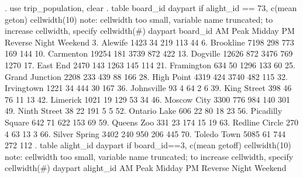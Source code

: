 . use trip_population, clear
{\smallskip}
. table board_id daypart if alight_id == 73, c(mean geton) cellwidth(10)
{\smallskip}
note: cellwidth too small, variable name truncated;
      to increase cellwidth, specify cellwidth(\#)
{\smallskip}
                     {\VBAR}                          daypart                          
            board_id {\VBAR}    AM Peak      Midday  PM Reverse       Night     Weekend
          3. Alewife {\VBAR}       1423          34         219         113          44
        6. Brookline {\VBAR}       7198         298         773         169         144
       10. Carmenton {\VBAR}      19254         181        3739         872         422
        13. Dogville {\VBAR}      12626         872        3476         769        1270
        17. East End {\VBAR}       2470         143        1263         145         114
      21. Framington {\VBAR}        634          50        1296         133          60
  25. Grand Junction {\VBAR}       2208         233         439          88         166
      28. High Point {\VBAR}       4319         424        3740         482         115
      32. Irvingtown {\VBAR}       1221          34         444          30         167
      36. Johnsville {\VBAR}         93           4          64           2           6
     39. King Street {\VBAR}        398          46          76          11          13
        42. Limerick {\VBAR}       1021          19         129          53          34
     46. Moscow City {\VBAR}       3300         776         984         140         301
    49. Ninth Street {\VBAR}         38          22         191           5           5
    52. Ontario Lake {\VBAR}        606          22          80          18          23
56. Picadilly Square {\VBAR}        642          71         622         153          69
      59. Queens Zoo {\VBAR}        331          23         174          15          19
  63. Redline Circle {\VBAR}        270           4          63          13           3
   66. Silver Spring {\VBAR}       3402         240         950         206         445
     70. Toledo Town {\VBAR}       5085          61         744         272         112
{\smallskip}
. table alight_id daypart if board_id==3, c(mean getoff) cellwidth(10)
{\smallskip}
note: cellwidth too small, variable name truncated;
      to increase cellwidth, specify cellwidth(\#)
{\smallskip}
                     {\VBAR}                          daypart                          
           alight_id {\VBAR}    AM Peak      Midday  PM Reverse       Night     Weekend
